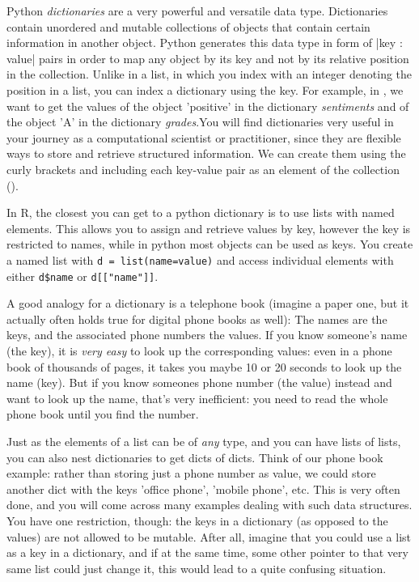 Python \emph{dictionaries} are a very powerful and versatile data type.
Dictionaries contain unordered and mutable collections of objects that
contain certain information in another object. Python generates this
data type in form of |{key : value}| pairs in order
to map any object by its key and not by its relative position in the
collection. Unlike in a list, in which you index with an integer denoting
the position in a list, you can index a dictionary using the key.
For example, in , we want to get the values of the object 'positive' in the
dictionary \emph{sentiments} and of the object 'A' in the dictionary
\emph{grades}.You will
find dictionaries very useful in your journey as a computational
scientist or practitioner, since they are flexible ways to store and
retrieve structured information. We can create them using the curly
brackets {} and including each key-value pair as an element of the
collection ().

In R, the closest you can get to a python dictionary is to use lists with named elements.
This allows you to assign and retrieve values by key,
however the key is restricted to names, while in python most objects can be used as keys.
You create a named list with \verb|d = list(name=value)| and access individual elements with either
\verb|d$name| or \verb|d[["name"]]|. 


A good analogy for a dictionary is a telephone book (imagine a paper
one, but it actually often holds true for digital phone books as
well): The names are the keys, and the associated phone numbers the
values. If you know someone's name (the key), it is \emph{very easy}
to look up the corresponding values: even in a phone book of thousands
of pages, it takes you maybe 10 or 20 seconds to look up the name
(key). But if you know someones phone number (the value) instead and
want to look up the name, that's very inefficient: you need to read
the whole phone book until you find the number.

Just as the elements of a list can be of \emph{any} type, and you can
have lists of lists, you can also nest dictionaries to get dicts of
dicts. Think of our phone book example: rather than storing just a
phone number as value, we could store another dict with the keys
'office phone', 'mobile phone', etc. This is very often done, and you
will come across many examples dealing with such data structures.
You have one restriction, though: the keys in a dictionary (as opposed
to the values) are not allowed to be mutable. After all, imagine that
you could use a list as a key in a dictionary, and if at the same time,
some other pointer to that very same list could just change it, this
would lead to a quite confusing situation.




